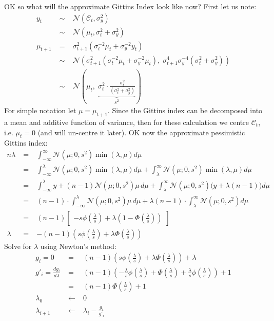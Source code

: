 \documentclass[a4paper,10pt]{article}
\newcommand{\pdff}{\phi(\tfrac{\lambda}{s})}
\newcommand{\cdff}{\Phi(\tfrac{\lambda}{s})}
\newcommand{\sqb}[1]{\begin{bmatrix}#1\end{bmatrix}}
\newcommand{\C}{\mathcal{C}}
\newcommand{\N}{\mathcal{N}}
\newcommand{\inv}{^{-1}}
\begin{document}
OK so what will the approximate Gittins Index look like now?
First let us note:
\begin{eqnarray}
 y_t &\;\sim\;& \N(\C_t,\sigma_y^2) \\
   &\;\sim\;& \N(\mu_t,\sigma^2_t + \sigma_y^2) \\
 \mu_{t+1} &\;=\;& \sigma^2_{t+1}(\sigma^{-2}_t\mu_t + \sigma_y^{-2}y_t) \label{eq:mu-new} \\
           &\;\sim\;& \N(\sigma^2_{t+1}(\sigma^{-2}_t\mu_t + \sigma_y^{-2}\mu_t), \;\sigma^4_{t+1}\sigma_y^{-4}(\sigma^2_t + \sigma_y^2)) \\
           &\;\sim\;& \N(\mu_t, \;\underbrace{\sigma^2_{t}\cdot\tfrac{\sigma^2_{t}}{(\sigma^2_t + \sigma_y^2)}}_{s^2})
\end{eqnarray}
For simple notation let $\mu = \mu_{t+1}$.
Since the Gittins index can be decomposed into a mean and additive function of variance,
then for these calculation we centre $\C_t$, i.e. $\mu_t=0$ (and will un-centre it later).
OK now the approximate pessimistic Gittins index:
\begin{eqnarray}
 n\lambda 
 &\;=\;& \int_{-\infty}^{\infty} \N(\mu;0,s^2)\min(\lambda,\mu)d\mu\\
 &\;=\;& \int_{-\infty}^{\lambda} \N(\mu;0,s^2)\min(\lambda,\mu)d\mu + \int_{\lambda}^{\infty} \N(\mu;0,s^2)\min(\lambda,\mu)d\mu\\
 &\;=\;& \int_{-\infty}^{\lambda} y+(n-1)\N(\mu;0,s^2)\mu \, d\mu + \int_{\lambda}^{\infty} \N(\mu;0,s^2) \big( y + \lambda(n-1) \big) d\mu \nonumber\\
 &\;=\;& (n-1)\cdot\int_{-\infty}^{\lambda} \N(\mu;0,s^2)\mu \, d\mu + \lambda(n-1) \cdot \int_{\lambda}^{\infty} \N(\mu;0,s^2) d\mu \nonumber\\
 &\;=\;& (n-1)\sqb{-s\pdff + \lambda(1-\cdff)} \\
 \lambda  &\;=\;& -(n-1)(s\pdff +\lambda\cdff)
\end{eqnarray} 
%
Solve for $\lambda$ using Newton's method:
%
\begin{eqnarray}
 g_i =0 &\;=\;& (n-1)(s\pdff +\lambda\cdff) + \lambda \\
 g'_i = \frac{dg_i}{d\lambda} &\;=\;& (n-1)(-\tfrac{\lambda}{s}\pdff +\cdff +\tfrac{\lambda}{s}\pdff) + 1 \\
                     &\;=\;& (n-1)\cdff + 1 \\
 \lambda_0 &\;\leftarrow\;& 0 \\
 \lambda_{i+1} &\;\leftarrow\;& \lambda_i - \frac{g_i}{g'_i}
\end{eqnarray}
\end{document}
